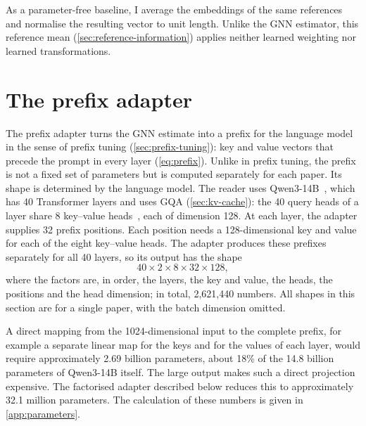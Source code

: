 As a parameter-free baseline, I average the embeddings of the same references and normalise the resulting vector to unit length. Unlike the GNN estimator, this reference mean (\autoref{sec:reference-information}) applies neither learned weighting nor learned transformations.

\section{The prefix adapter}
\label{sec:prefix-adapter}

The prefix adapter turns the GNN estimate into a prefix for the language model in the sense of prefix tuning (\autoref{sec:prefix-tuning}): key and value vectors that precede the prompt in every layer (\autoref{eq:prefix}). Unlike in prefix tuning, the prefix is not a fixed set of parameters but is computed separately for each paper. Its shape is determined by the language model. The reader uses Qwen3-14B~\cite{yang2025qwen3}, which has 40 Transformer layers and uses GQA (\autoref{sec:kv-cache}): the 40 query heads of a layer share 8 key--value heads~\cite{yang2025qwen3}, each of dimension 128. At each layer, the adapter supplies 32 prefix positions. Each position needs a 128-dimensional key and value for each of the eight key--value heads. The adapter produces these prefixes separately for all 40 layers, so its output has the shape
\[
  40 \times 2 \times 8 \times 32 \times 128,
\]
where the factors are, in order, the layers, the key and value, the heads, the positions and the head dimension; in total, 2,621,440 numbers. All shapes in this section are for a single paper, with the batch dimension omitted.

A direct mapping from the 1024-dimensional input to the complete prefix, for example a separate linear map for the keys and for the values of each layer, would require approximately 2.69 billion parameters, about 18\% of the 14.8 billion parameters of Qwen3-14B itself. The large output makes such a direct projection expensive. The factorised adapter described below reduces this to approximately 32.1 million parameters. The calculation of these numbers is given in \autoref{app:parameters}.

